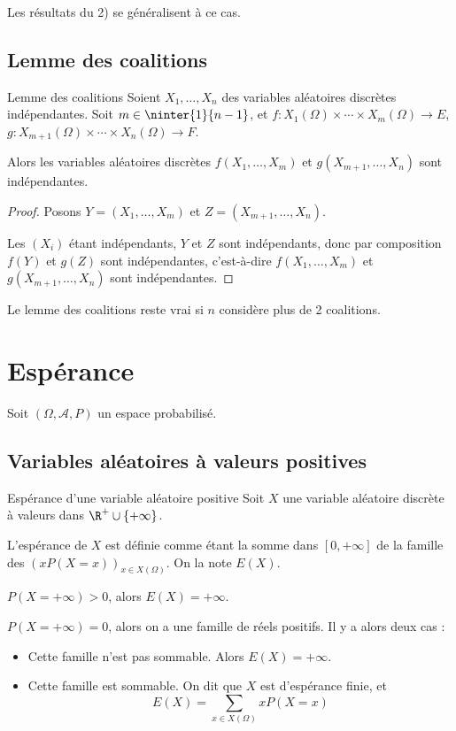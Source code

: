 Les résultats du 2) se généralisent à ce cas. 

\subsection{Lemme des coalitions} 

\begin{theoreme}{Lemme des coalitions}{}
    Soient $X_1, \dots, X_n$ des variables aléatoires discrètes indépendantes. 
    Soit $m \in \ninter{1}{n - 1}$, et $f : X_1(\Omega) \times \cdots \times X_m(\Omega) \to E$,
    $g : X_{m + 1}(\Omega) \times \cdots \times X_n(\Omega) \to F$.

    Alors les variables aléatoires discrètes $f(X_1, \dots, X_m)$ et $g(X_{m + 1}, \dots, X_n)$ sont indépendantes.
\end{theoreme}

\begin{proof}
    Posons $Y = (X_1, \dots, X_m)$ et $Z = (X_{m + 1}, \dots, X_n)$.

    Les $(X_i)$ étant indépendants, $Y$ et $Z$ sont indépendants, donc par composition $f(Y)$ et $g(Z)$ sont indépendantes,
    c'est-à-dire $f(X_1, \dots, X_m)$ et $g(X_{m + 1}, \dots, X_n)$ sont indépendantes.
\end{proof}

\begin{proposition}{}{}
    Le lemme des coalitions reste vrai si $n$ considère plus de 2 coalitions. 
\end{proposition}

\section{Espérance}
Soit $(\Omega, \mathcal A, P)$ un espace probabilisé. 

\subsection{Variables aléatoires à valeurs positives}

\begin{definition}{Espérance d'une variable aléatoire positive}{}
    Soit $X$ une variable aléatoire discrète à valeurs dans $\R^+ \cup \{+\infty\}$.

    L'espérance de $X$ est définie comme étant la somme dans $[0, + \infty]$ 
    de la famille des $(x P(X = x) )_{x \in X(\Omega)}$. On la note $E(X)$.

     $P(X = + \infty) > 0$, alors $E(X) = + \infty$.

     $P(X = + \infty) = 0$, alors on a une famille de réels positifs. 
    Il y a alors deux cas : 
    \begin{itemize}
        \item Cette famille n'est pas sommable. Alors $E(X) = + \infty$.
        \item Cette famille est sommable. On dit que $X$ est d'espérance finie, et 
        $$ E(X) = \sum_{x \in X(\Omega)} x P(X = x) $$
    \end{itemize}
\end{definition}

